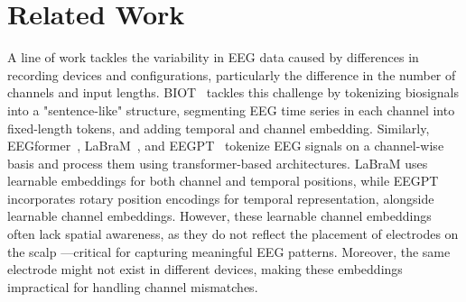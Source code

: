 \documentclass{article} %
\begin{document}



\newpage
\appendix
\section{Related Work}
A line of work tackles the variability in EEG data caused by differences in recording devices and configurations, particularly the difference in the number of channels and input lengths. BIOT~\citep{Biot} tackles this challenge by tokenizing biosignals into a "sentence-like" structure, segmenting EEG time series in each channel into fixed-length tokens, and adding temporal and channel embedding. Similarly, EEGformer~\citep{EEGFormer}, LaBraM~\citep{LaBraM}, and EEGPT~\citep{EEGPT} tokenize EEG signals on a channel-wise basis and process them using transformer-based architectures. LaBraM uses learnable embeddings for both channel and temporal positions, while EEGPT incorporates rotary position encodings for temporal representation, alongside learnable channel embeddings. However, these learnable channel embeddings often lack spatial awareness, as they do not reflect the placement of electrodes on the scalp —critical for capturing meaningful EEG patterns. Moreover, the same electrode might not exist in different devices, making these embeddings impractical for handling channel mismatches.
\end{document}
